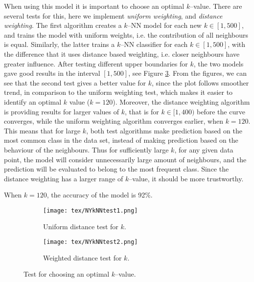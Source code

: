    When using this model it is important to choose an optimal $k$--value. There are several tests for this, here we implement \emph{uniform weighting}, and \emph{distance weighting}. The first algorithm creates a $k$--NN model for each new $k \in [1, 500]$, and trains the model with uniform weights, i.e. the contribution of all neighbours is equal. Similarly, the latter trains a $k$--NN classifier for each $k \in [1, 500]$, with the difference that it uses distance based weighting, i.e. closer neighbours have greater influence. After testing different upper boundaries for $k$, the two models gave good results in the interval $[1,500]$, see Figure \ref{fig:kNN_comparison}. From the figures, we can see that the second test gives a better value for $k$, since the plot follows smoother trend, in comparison to the uniform weighting test, which makes it easier to identify an optimal $k$ value ($k = 120$). Moreover, the distance weighting algorithm is providing results for larger values of $k$, that is for $k \in [1, 400)$ before the curve converges, while the uniform weighting algorithm converges earlier, when $k = 120$. This means that for large $k$, both test algorithms make prediction based on the most common class in the data set, instead of making prediction based on the behaviour of the neighbours. Thus for sufficiently large $k$, for any given data point, the model will consider unnecessarily large amount of neighbours, and the prediction will be evaluated to belong to the most frequent class. Since the distance weighting has a larger range of $k$--value, it should be more trustworthy.

    When $k = 120$, the accuracy of the model is 92\%.
    
    \begin{figure}[htbp]
        \centering
        \begin{subfigure}{0.45\textwidth}
            \centering
            \texttt{[image: tex/NYkNNtest1.png]}
            \caption{Uniform distance test for $k$.}
            \label{fig:kNN_fig1}
        \end{subfigure}
        \hfill
        \begin{subfigure}{0.45\textwidth}
            \centering
            \texttt{[image: tex/NYkNNtest2.png]}
            \caption{Weighted distance test for $k$.}
            \label{fig:kNN_fig2}
        \end{subfigure}
        \caption{Test for choosing an optimal $k$--value.}
        \label{fig:kNN_comparison}
    \end{figure}

